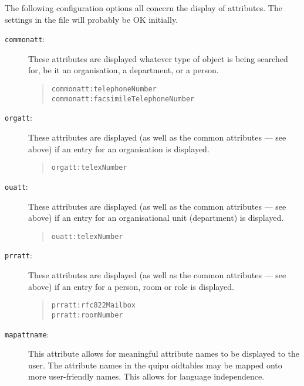 The following configuration options all concern the display of attributes.
The settings in the  file will probably be OK initially.

\begin{description}

\item [\verb+commonatt+:]  These attributes are displayed whatever type of object
is being searched for, be it an organisation, a department, or a person.

\begin{quote}\small\begin{verbatim}
commonatt:telephoneNumber
commonatt:facsimileTelephoneNumber
\end{verbatim}\end{quote}

\item [\verb+orgatt+:]  These attributes are displayed (as well as the common
attributes --- see above) if an entry for an organisation is displayed.

\begin{quote}\small\begin{verbatim}
orgatt:telexNumber
\end{verbatim}\end{quote}

\item [\verb+ouatt+:]  These attributes are displayed (as well as the common
attributes --- see above) if an entry for an organisational unit (department)
is displayed.

\begin{quote}\small\begin{verbatim}
ouatt:telexNumber
\end{verbatim}\end{quote}

\item [\verb+prratt+:]  These attributes are displayed (as well as the common
attributes --- see above) if an entry for a person, room or role is displayed.

\begin{quote}\small\begin{verbatim}
prratt:rfc822Mailbox
prratt:roomNumber
\end{verbatim}\end{quote}

\item [\verb+mapattname+:]  This attribute allows for meaningful attribute names to
be displayed to the user.  The attribute names in the quipu
oidtables may be mapped onto more user-friendly names.  This allows for 
language independence.  


\end{description}
